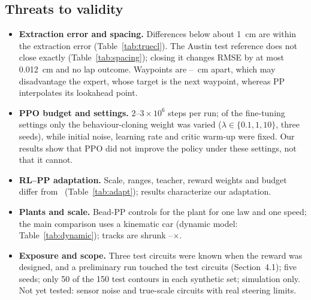 \documentclass{IJCAS}
\begin{document}
\subsection{Threats to validity}
\begin{itemize}\setlength{\itemsep}{1pt}\setlength{\parskip}{0pt}\setlength{\topsep}{2pt}
\item \textbf{Extraction error and spacing.} Differences below about 1~cm are within the extraction error (Table~\ref{tab:truecl}). The Austin test reference does not close exactly (Table~\ref{tab:spacing}); closing it changes RMSE by at most 0.012~cm and no lap outcome. Waypoints are \VspMin--\VspMax~cm apart, which may disadvantage the expert, whose target is the next waypoint, whereas PP interpolates its lookahead point.
\item \textbf{PPO budget and settings.} $2$--$3\times10^6$ steps per run; of the fine-tuning settings only the behaviour-cloning weight was varied ($\lambda\in\{0.1,1,10\}$, three seeds), while initial noise, learning rate and critic warm-up were fixed. Our results show that PPO did not improve the policy under these settings, not that it cannot.
\item \textbf{RL--PP adaptation.} Scale, ranges, teacher, reward weights and budget differ from~\cite{elgouhary2026} (Table~\ref{tab:adapt}); results characterize our adaptation.
\item \textbf{Plants and scale.} Bead-PP controls for the plant for one law and one speed; the main comparison uses a kinematic car (dynamic model: Table~\ref{tab:dynamic}); tracks are shrunk \VscaleLo--\VscaleHi$\times$.
\item \textbf{Exposure and scope.} Three test circuits were known when the reward was designed, and a preliminary run touched the test circuits (Section~4.1); five seeds; only 50 of the 150 test contours in each synthetic set; simulation only. Not yet tested: sensor noise and true-scale circuits with real steering limits.
\end{itemize}
\end{document}

